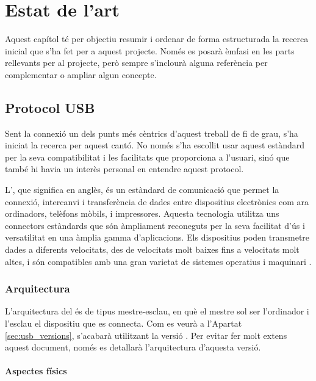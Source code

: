 \chapter{Estat de l'art}
\label{cap:estat-de-l-art}

Aquest capítol té per objectiu resumir i ordenar de forma estructurada la
recerca inicial que s'ha fet per a aquest projecte. Només es posarà èmfasi en
les parts rellevants per al projecte, però sempre s'inclourà alguna referència
per complementar o ampliar algun concepte.

\section{Protocol USB}

Sent la connexió  un dels punts més cèntrics d'aquest treball de
fi de grau, s'ha iniciat la recerca per aquest cantó. No només s'ha escollit
usar aquest estàndard per la seva compatibilitat
i les facilitats que proporciona a l'usuari, sinó que també hi havia un interès
personal en entendre aquest protocol.

L', que significa  en anglès, és un
estàndard de comunicació que permet la connexió, intercanvi i transferència de
dades entre dispositius electrònics com ara ordinadors, telèfons mòbils, i
impressores. Aquesta tecnologia utilitza uns connectors estàndards que són
àmpliament reconeguts per la seva facilitat d'ús i versatilitat en una àmplia
gamma d'aplicacions. Els dispositius  poden transmetre dades a
diferents velocitats, des de velocitats molt baixes fins a velocitats molt
altes, i són compatibles amb una gran varietat de sistemes operatius i
maquinari \cite{Axelson2015USB}.

\subsection{Arquitectura}

L'arquitectura del  és de tipus mestre-esclau, en què el mestre sol ser
l'ordinador i l'esclau el dispositiu que es connecta. Com es veurà a l'Apartat
\ref{sec:usb_versions}, s'acabarà utilitzant la versió . Per
evitar fer molt extens aquest document, només es detallarà l'arquitectura
d'aquesta versió.

\subsubsection*{Aspectes físics}
\label{subsub:usb_physic}


